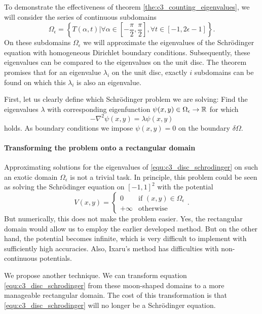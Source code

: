 To demonstrate the effectiveness of theorem \ref{the:c3_counting_eigenvalues}, we will consider the series of continuous subdomains
$$
    \Omega_\epsilon = \left\{T(\alpha, t) | \forall \alpha \in \left[-\frac{\pi}{2}, \frac{\pi}{2}\right], \forall t \in [-1, 2\epsilon - 1]  \right\}\text{.}
$$
On these subdomains $\Omega_\epsilon$ we will approximate the eigenvalues of the Schrödinger equation with homogeneous Dirichlet boundary conditions. Subsequently, these eigenvalues can be compared to the eigenvalues on the unit disc. The theorem promises that for an eigenvalue $\lambda_i$ on the unit disc, exactly $i$ subdomains can be found on which this $\lambda_i$ is also an eigenvalue.

First, let us clearly define which Schrödinger problem we are solving: Find the eigenvalues $\lambda$ with corresponding eigenfunction $\psi(x, y) \in \Omega_\epsilon \to \mathbb{R}$ for which
\begin{equation}\label{equ:c3_disc_schrodinger}
    -\nabla^2 \psi(x, y) = \lambda \psi(x, y)
\end{equation}
holds. As boundary conditions we impose $\psi(x, y) = 0$ on the boundary $\delta \Omega$.

\paragraph{Transforming the problem onto a rectangular domain}

Approximating solutions for the eigenvalues of \eqref{equ:c3_disc_schrodinger} on such an exotic domain $\Omega_\epsilon$ is not a trivial task. In principle, this problem could be seen as solving the Schrödinger equation on $[-1,1]^2$ with the potential
$$
    V(x, y) = \begin{cases}
        0       & \text{if $(x, y)\in \Omega_\epsilon$} \\
        +\infty & \text{otherwise}
    \end{cases} {}\text{.}
$$
But numerically, this does not make the problem easier. Yes, the rectangular domain would allow us to employ the earlier developed method. But on the other hand, the potential becomes infinite, which is very difficult to implement with sufficiently high accuracies. Also, Ixaru's method has difficulties with non-continuous potentials.

We propose another technique. We can transform equation \eqref{equ:c3_disc_schrodinger} from these moon-shaped domains to a more manageable rectangular domain. The cost of this transformation is that \eqref{equ:c3_disc_schrodinger} will no longer be a Schrödinger equation.

